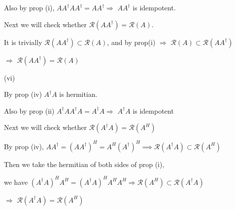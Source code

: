 \documentclass[10pt,letter]{article}
\begin{document}
Also by prop (i), $AA^\dagger A A^\dagger = A A^\dagger \Rightarrow$ $A A^\dagger$ is idempotent.

Next we will check whether $\mathcal{R}(AA^\dagger) = \mathcal{R} (A)$.

It is trivially $\mathcal{R}(A A^\dagger) \subset \mathcal{R}(A)$, and by prop(i) $\Rightarrow$ $ \mathcal{R}(A) \subset \mathcal{R}(A A^\dagger)$

$\Rightarrow$ $\mathcal{R}(AA^\dagger) = \mathcal{R} (A)$

\noindent (vi) 

By prop (iv) $A^\dagger A$ is hermitian. 

Also by prop (ii) $A^\dagger A A^\dagger A = A^\dagger A \Rightarrow$ $A^\dagger A$ is idempotent

Next we will check whether $\mathcal{R}(A^\dagger A) = \mathcal{R} (A^H)$

By prop (iv), 
$AA^\dagger = (AA^\dagger)^H = A^H (A^\dagger)^H \implies \mathcal{R}(A^\dagger A) \subset \mathcal{R} (A^H) $

Then we take the hermitian of both sides of prop (i),

we have $ (A^\dagger A)^H A^H = (A^\dagger A)^H A^H A^H \Rightarrow \mathcal{R} (A^H) \subset \mathcal{R}(A^\dagger A) $

$\Rightarrow$ $\mathcal{R}(A^\dagger A) = \mathcal{R} (A^H)$
\end{document}
